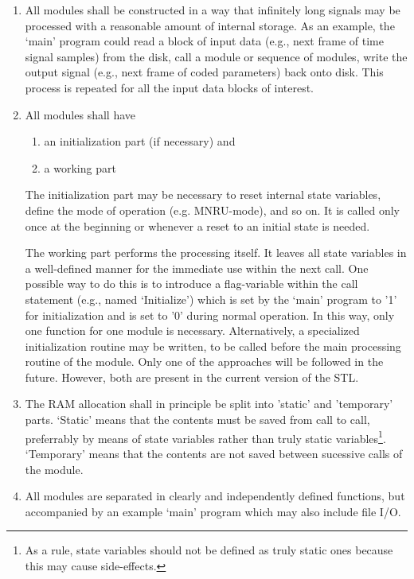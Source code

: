 \begin{enumerate}
\item All modules shall be constructed in a way that infinitely long
      signals may be processed with a reasonable amount of internal storage.
      As an example, the `main' program could read a block of input
      data (e.g., next frame of time signal samples) from the disk,
      call a module or sequence of modules, write the output
      signal (e.g., next frame of coded parameters) back onto disk.
      This process is repeated for all the input data blocks of interest.

\item All modules shall have
      \begin{enumerate}
      \item an initialization part (if necessary) and
      \item a working part
      \end{enumerate}

      The initialization part may be necessary to reset internal
      state variables, define the mode of operation (e.g. MNRU-mode),
      and so on. It is called only once at the beginning or whenever
      a reset to an initial state is needed.


      The working part performs the processing itself. It leaves all
      state variables in a well-defined manner for the immediate use
      within the next call. One possible way to do this is to
      introduce a flag-variable within the call statement (e.g.,
      named `Initialize') which is set by the `main' program to '1'
      for initialization and is set to '0' during normal
      operation. In this way, only one function for one module is
      necessary.  Alternatively, a specialized initialization
      routine may be written, to be called before the main
      processing routine of the module. Only one of the approaches
      will be followed in the future. However, both are present in
      the current version of the STL.

\item The RAM allocation shall in principle be split into 'static' and
      'temporary' parts. `Static' means that the contents must be
      saved from call to call, preferrably by means of state variables
      rather than truly static variables\footnote{\SF As a rule, state
      variables should not be defined as truly static ones because
      this may cause side-effects.}. `Temporary' means that the
      contents are not saved between sucessive calls of the module.

\item All modules are separated in clearly and independently defined
      functions, but accompanied by an example `main' program which
      may also include file I/O.
\end{enumerate}


